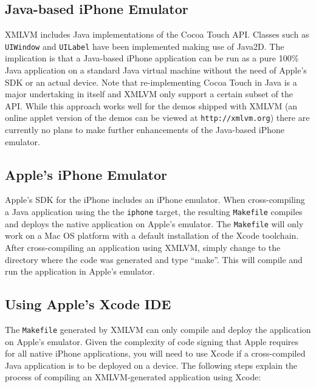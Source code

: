 \documentclass[11pt]{book}
\begin{document}
\subsection{Java-based iPhone Emulator}
\label{SEC_JAVA_BASED_IPHONE_EMULATOR}

XMLVM includes Java implementations of the Cocoa Touch API. Classes
such as \texttt{UIWindow} and \texttt{UILabel} have been implemented
making use of Java2D. The implication is that a Java-based iPhone
application can be run as a pure 100\% Java application on a standard
Java virtual machine without the need of Apple's SDK or an actual
device. Note that re-implementing Cocoa Touch in Java is a major
undertaking in itself and XMLVM only support a certain subset of the
API. While this approach works well for the demos shipped with XMLVM
(an online applet version of the demos can be viewed at
\texttt{http://xmlvm.org}) there are currently no plans to make
further enhancements of the Java-based iPhone emulator.


\subsection{Apple's iPhone Emulator}

Apple's SDK for the iPhone includes an iPhone emulator. When
cross-compiling a Java application using the the \texttt{iphone}
target, the resulting \texttt{Makefile} compiles and deploys the
native application on Apple's emulator. The \texttt{Makefile} will
only work on a Mac OS platform with a default installation of the
Xcode toolchain. After cross-compiling an application using XMLVM,
simply change to the directory where the code was generated and type
``make''. This will compile and run the application in Apple's
emulator.


\subsection{Using Apple's Xcode IDE}

The \texttt{Makefile} generated by XMLVM can only compile and deploy
the application on Apple's emulator. Given the complexity of code
signing that Apple requires for all native iPhone applications, you
will need to use Xcode if a cross-compiled Java application is to be
deployed on a device. The following steps explain the process of
compiling an XMLVM-generated application using Xcode:
\end{document}
